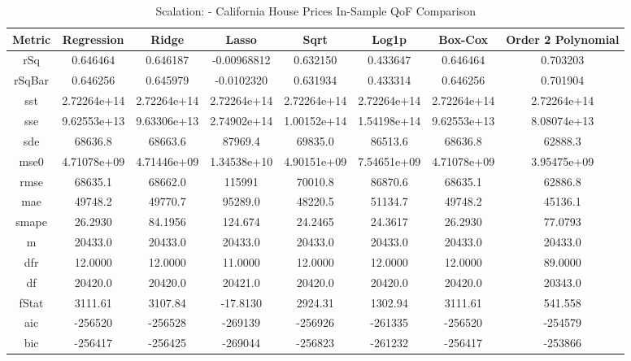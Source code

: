 \documentclass{article}
\begin{document}
\begin{table}[H]
\centering
\caption{Scalation: - California House Prices In-Sample QoF Comparison}
\label{tab:Scalation: - House Prices In-Sample QoF Comparison}
\begin{tabular}{|c|c|c|c|c|c|c|c|} \hline 
Metric & Regression & Ridge & Lasso & Sqrt & Log1p &  Box-Cox & Order 2 Polynomial \\ \hline \hline 
rSq &0.646464 & 0.646187 &      -0.00968812 &   0.632150 &      0.433647 &      0.646464 &      0.703203 \\ \hline 
rSqBar &0.646256 &      0.645979 &      -0.0102320 &    0.631934 &      0.433314 &      0.646256 &      0.701904 \\ \hline 
sst &2.72264e+14 &      2.72264e+14 &   2.72264e+14 &   2.72264e+14 &   2.72264e+14 &   2.72264e+14 &   2.72264e+14 \\ \hline 
sse &9.62553e+13 &      9.63306e+13 &   2.74902e+14 &   1.00152e+14 &   1.54198e+14 &   9.62553e+13 &   8.08074e+13 \\ \hline 
sde &68636.8 &  68663.6 &       87969.4 &       69835.0 &       86513.6 &       68636.8 &       62888.3 \\ \hline 
mse0 &4.71078e+09 &     4.71446e+09 &   1.34538e+10 &   4.90151e+09 &   7.54651e+09 &   4.71078e+09 &   3.95475e+09 \\ \hline 
rmse &68635.1 & 68662.0 &       115991 &        70010.8 &       86870.6 &       68635.1 &       62886.8 \\ \hline 
mae &49748.2 &  49770.7 &       95289.0 &       48220.5 &       51134.7 &       49748.2 &       45136.1 \\ \hline 
smape &26.2930 &        84.1956 &       124.674 &       24.2465 &       24.3617 &       26.2930 &       77.0793 \\ \hline 
m &20433.0 &    20433.0 &       20433.0 &       20433.0 &       20433.0 &       20433.0 &       20433.0 \\ \hline 
dfr &12.0000 &  12.0000 &       11.0000 &       12.0000 &       12.0000 &       12.0000 &       89.0000 \\ \hline 
df &20420.0 &   20420.0 &       20421.0 &       20420.0 &       20420.0 &       20420.0 &       20343.0 \\ \hline 
fStat &3111.61 &        3107.84 &       -17.8130 &      2924.31 &       1302.94 &       3111.61 &       541.558 \\ \hline 
aic &-256520 &  -256528 &       -269139 &       -256926 &       -261335 &       -256520 &       -254579 \\ \hline 
bic &-256417 &  -256425 &       -269044 &       -256823 &       -261232 &       -256417 &       -253866 \\ \hline 
\end{tabular}
\end{table}
\end{document}
